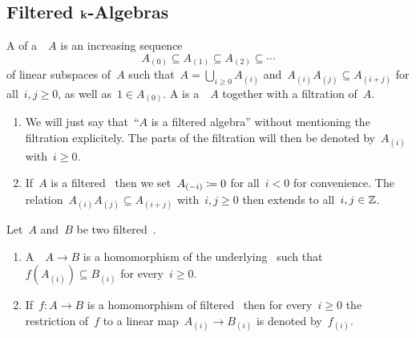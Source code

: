\subsection{Filtered \texorpdfstring{$\kf$}{k}-Algebras}


\begin{definition}
  A  of a~\algebra{$\kf$}~$A$ is an increasing sequence
  \[
    A_{(0)}
    \subseteq
    A_{(1)}
    \subseteq
    A_{(2)}
    \subseteq
    \dotsb
  \]
  of linear subspaces of~$A$ such that~$A = \bigcup_{i \geq 0} A_{(i)}$ and~$A_{(i)} A_{(j)} \subseteq A_{(i+j)}$ for all~$i,j \geq 0$, as well as~$1 \in A_{(0)}$.
  A  is a~\algebra{$\kf$}~$A$ together with a filtration of~$A$.
\end{definition}


\begin{remark}
  \label{filtration conventions}
  \leavevmode
  \begin{enumerate}
    \item
      We will just say that~\enquote{$A$ is a filtered algebra} without mentioning the filtration explicitely.
      The parts of the filtration will then be denoted by~$A_{(i)}$ with~$i \geq 0$.
    \item
      If~$A$ is a filtered~{\algebra{$\kf$}} then we set~$A_{(-i)} \coloneqq 0$ for all~$i < 0$ for convenience.
      The relation~$A_{(i)} A_{(j)} \subseteq A_{(i+j)}$ with~$i,j \geq 0$ then extends to all~$i, j \in \mathbb{Z}$.
  \end{enumerate}
\end{remark}


\begin{definition}
  Let~$A$ and~$B$ be two filtered~\algebras{$\kf$}.
  \begin{enumerate}
    \item
      A~~$A \to B$ is a homomorphism of the underlying~{\algebras{$\kf$}} such that~$f(A_{(i)}) \subseteq B_{(i)}$ for every~$i \geq 0$.
    \item
      If~$f \colon A \to B$ is a homomorphism of filtered~{\algebras{$\kf$}} then for every~$i \geq 0$ the restriction of~$f$ to a linear map~$A_{(i)} \to B_{(i)}$ is denoted by~$f_{(i)}$.
  \end{enumerate}
\end{definition}


